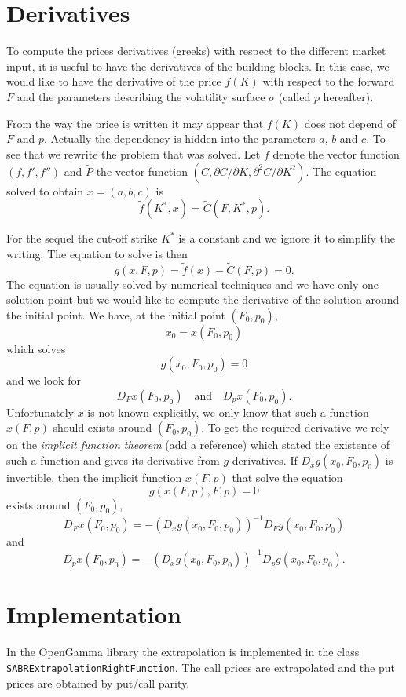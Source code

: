 \documentclass[]{amsart}
\newcommand{\class}[1]{{\texttt{#1}}}
\begin{document}
\section{Derivatives}

To compute the prices derivatives (greeks) with respect to the different market input, it is useful to have the derivatives of the building blocks. In this case, we would like to have the derivative of the price $f(K)$ with respect to the forward $F$ and the parameters describing the volatility surface $\sigma$ (called $p$ hereafter). 

From the way the price is written it may appear that $f(K)$ does not depend of $F$ and $p$. Actually the dependency is hidden into the parameters $a$, $b$ and $c$. To see that we rewrite the problem that was solved. Let $\tilde f$ denote the vector function $(f, f', f'')$ and $\tilde P$ the vector function $(C, \partial C / \partial K, \partial^2 C/\partial K^2)$. The equation solved to obtain $x=(a,b,c)$ is
\[
\tilde f(K^*, x) = \tilde C (F, K^*, p).
\]

For the sequel the cut-off strike $K^*$ is a constant and we ignore it to simplify the writing. The equation to solve is then
\[
g(x, F, p) = \tilde f(x) - \tilde C(F, p)=0.
\]
The equation is usually solved by numerical techniques and we have only one solution point but we would like to compute the derivative of the solution around the initial point. We have, at the initial point $(F_0, p_0)$,
\[
x_0 = x(F_0, p_0)
\]
which solves
\[
g(x_0, F_0, p_0) = 0
\]
and we look for 
\[
D_F x(F_0, p_0) \quad \mbox{and} \quad D_p x(F_0, p_0).
\]
Unfortunately $x$ is not known explicitly, we only know that such a function $x(F,p)$ should exists around $(F_0, p_0)$. To get the required derivative we rely on the \emph{implicit function theorem} (add a reference) which stated the existence of such a function and gives its derivative from $g$ derivatives. If $D_x g(x_0, F_0, p_0)$ is invertible, then the implicit function $x(F,p)$ that solve the equation
\[
g(x(F,p), F, p)=0
\]
exists around $(F_0,p_0)$, 
\[
D_F x(F_0, p_0) = - (D_x g(x_0, F_0, p_0))^{-1}D_F g(x_0, F_0, p_0)
\]
and 
\[
D_p x(F_0, p_0) = - (D_x g(x_0, F_0, p_0))^{-1}D_p g(x_0, F_0, p_0).
\]


\section{Implementation}

In the OpenGamma library the extrapolation is implemented in the class \class{SABRExtrapolationRightFunction}. The call prices are extrapolated and the put prices are obtained by put/call parity.
\end{document}
